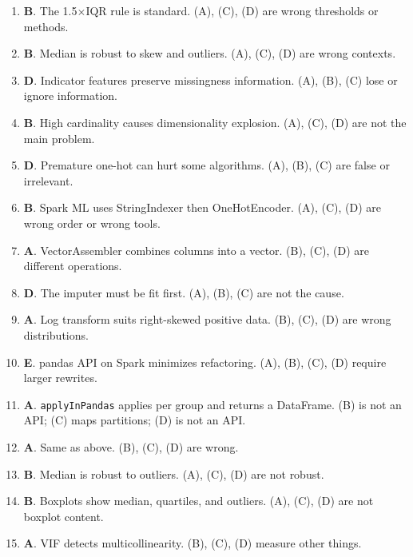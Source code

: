 \documentclass[11pt]{article}
\begin{document}
\begin{enumerate}[leftmargin=*, label=\textbf{Q\arabic*.}]
		\item \textbf{B}. The 1.5$\times$IQR rule is standard. (A), (C), (D) are wrong thresholds or methods.
		
		\item \textbf{B}. Median is robust to skew and outliers. (A), (C), (D) are wrong contexts.
		
		\item \textbf{D}. Indicator features preserve missingness information. (A), (B), (C) lose or ignore information.
		
		\item \textbf{B}. High cardinality causes dimensionality explosion. (A), (C), (D) are not the main problem.
		
		\item \textbf{D}. Premature one-hot can hurt some algorithms. (A), (B), (C) are false or irrelevant.
		
		\item \textbf{B}. Spark ML uses StringIndexer then OneHotEncoder. (A), (C), (D) are wrong order or wrong tools.
		
		\item \textbf{A}. VectorAssembler combines columns into a vector. (B), (C), (D) are different operations.
		
		\item \textbf{D}. The imputer must be fit first. (A), (B), (C) are not the cause.
		
		\item \textbf{A}. Log transform suits right-skewed positive data. (B), (C), (D) are wrong distributions.
		
		\item \textbf{E}. pandas API on Spark minimizes refactoring. (A), (B), (C), (D) require larger rewrites.
		
		\item \textbf{A}. \texttt{applyInPandas} applies per group and returns a DataFrame. (B) is not an API; (C) maps partitions; (D) is not an API.
		
		\item \textbf{A}. Same as above. (B), (C), (D) are wrong.
		
		\item \textbf{B}. Median is robust to outliers. (A), (C), (D) are not robust.
		
		\item \textbf{B}. Boxplots show median, quartiles, and outliers. (A), (C), (D) are not boxplot content.
		
		\item \textbf{A}. VIF detects multicollinearity. (B), (C), (D) measure other things.
		

\end{enumerate}
\end{document}
